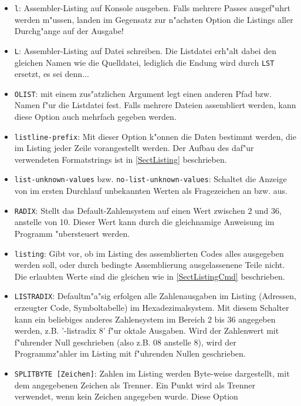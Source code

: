 \documentclass[12pt,a4paper,twoside]{report}
\newcommand{\tty}[1]{{\tt #1}}
\begin{document}
\begin{itemize}
\item{\tty{l}: Assembler-Listing auf Konsole ausgeben.  Falls mehrere
      Passes ausgef"uhrt werden m"ussen, landen im Gegensatz zur
      n"achsten Option die Listings aller Durchg"ange auf der Ausgabe!}
\item{\tty{L}: Assembler-Listing auf Datei schreiben.  Die Listdatei erh"alt
      dabei den gleichen Namen wie die Quelldatei, lediglich die Endung
      wird durch \tty{LST} ersetzt, es sei denn...}
\item{\tty{OLIST}: mit einem zus"atzlichen Argument legt einen anderen
      Pfad bzw. Namen f"ur die Listdatei fest.  Falls mehrere Dateien
      assembliert werden, kann diese Option auch mehrfach gegeben werden.}
\item{\tty{listline-prefix}: Mit dieser Option k"onnen die Daten
      bestimmt werden, die im Listing jeder Zeile vorangestellt
      werden.  Der Aufbau des daf"ur verwendeten Formatstrings ist in
      \ref{SectListing} beschrieben.}
\item{{\tt list-unknown-values} bzw. {\tt no-list-unknown-values}: Schaltet
      die Anzeige von im ersten Durchlauf unbekannten Werten als Fragezeichen
      an bzw. aus.}
\item{\label{radix}\tty{RADIX}: Stellt das Default-Zahlensystem auf
      einen Wert zwischen 2 und 36, anstelle von 10.  Dieser Wert kann
      durch die gleichnamige Anweisung im Programm "ubersteuert werden.}
\item{\tty{listing}: Gibt vor, ob im Listing des assemblierten Codes alles
      ausgegeben werden soll, oder durch bedingte Assemblierung ausgelassenene
      Teile nicht.  Die erlaubten Werte sind die gleichen wie in \ref{SectListingCmd}
      beschrieben.}
\item{\label{listradix}\tty{LISTRADIX}: Defaultm"a"sig erfolgen alle Zahlenausgaben im Listing
      (Adressen, erzeugter Code, Symboltabelle) im Hexadezimalsystem.  Mit
      diesem Schalter kann ein beliebiges anderes Zahlensystem im Bereich
      2 bis 36 angegeben werden, z.B. '-listradix 8' f"ur oktale Ausgaben.
      Wird der Zahlenwert mit f"uhrender Null geschrieben (also z.B. 08
      anstelle 8), wird der Programmz"ahler im Listing mit f"uhrenden
      Nullen geschrieben.}
\item{\tty{SPLITBYTE [Zeichen]}: Zahlen im Listing werden Byte-weise
      dargestellt, mit dem angegebenen Zeichen als Trenner.  Ein Punkt wird
      als Trenner verwendet, wenn kein Zeichen angegeben wurde.  Diese Option
}
\end{itemize}
\end{document}
